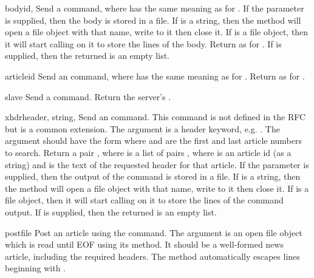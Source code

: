\begin{methoddesc}{body}{id,}
Send a  command, where  has the same meaning as for
.  If the  parameter is supplied, then
the body is stored in a file.  If  is a string, then
the method will open a file object with that name, write to it then close it.
If  is a file object, then it will start calling
 on it to store the lines of the body.
Return as for .  If  is supplied, then
the returned  is an empty list.
\end{methoddesc}

\begin{methoddesc}{article}{id}
Send an  command, where  has the same meaning as
for .  Return as for .
\end{methoddesc}

\begin{methoddesc}{slave}{}
Send a  command.  Return the server's .
\end{methoddesc}

\begin{methoddesc}{xhdr}{header, string, }
Send an  command.  This command is not defined in the RFC
but is a common extension.  The  argument is a header
keyword, e.g. .  The  argument should have
the form  where  and
 are the first and last article numbers to search.  Return a
pair , where  is a list of
pairs , where  is an article id
(as a string) and  is the text of the requested header for
that article.
If the  parameter is supplied, then the output of the 
 command is stored in a file.  If  is a string, 
then the method will open a file object with that name, write to it 
then close it.  If  is a file object, then it will start
calling  on it to store the lines of the command output.
If  is supplied, then the returned  is an empty list.
\end{methoddesc}

\begin{methoddesc}{post}{file}
Post an article using the  command.  The 
argument is an open file object which is read until EOF using its
 method.  It should be a well-formed news article,
including the required headers.  The  method
automatically escapes lines beginning with .
\end{methoddesc}

